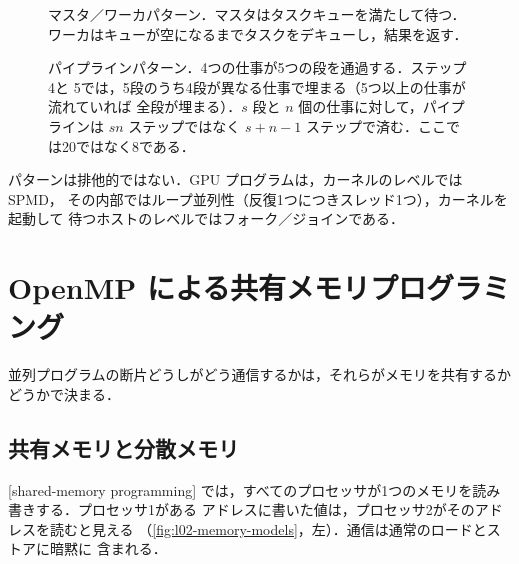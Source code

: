\documentclass[../main.tex]{subfiles}
\begin{document}
\begin{figure}[tb]
  \centering
  
  \caption{マスタ／ワーカパターン．マスタはタスクキューを満たして待つ．
    ワーカはキューが空になるまでタスクをデキューし，結果を返す．}
  \label{fig:l02-master-worker}
\end{figure}

\begin{marginfigure}
  \resizebox{\linewidth}{!}{}
  \caption{フォーク／ジョインパターン．1つの制御の流れが4つの並列タスクに
    フォークし，再びジョインする．}
  \label{fig:l02-fork-join}
\end{marginfigure}

\begin{figure}[tb]
  \centering
  
  \caption{パイプラインパターン．4つの仕事が5つの段を通過する．ステップ4と
    5では，5段のうち4段が異なる仕事で埋まる（5つ以上の仕事が流れていれば
    全段が埋まる）．$s$ 段と $n$ 個の仕事に対して，パイプラインは $sn$
    ステップではなく $s+n-1$ ステップで済む．ここでは20ではなく8である．}
  \label{fig:l02-pipeline}
\end{figure}

\begin{keypoint}
  パターンは排他的ではない．GPU プログラムは，カーネルのレベルでは SPMD，
  その内部ではループ並列性（反復1つにつきスレッド1つ），カーネルを起動して
  待つホストのレベルではフォーク／ジョインである．
\end{keypoint}

\section{OpenMP による共有メモリプログラミング}
\label{sec:l02-openmp}

並列プログラムの断片どうしがどう通信するかは，それらがメモリを共有するか
どうかで決まる．

\subsection{共有メモリと分散メモリ}

\begin{definition}[共有メモリプログラミング]
  [shared-memory programming]
  では，すべてのプロセッサが1つのメモリを読み書きする．プロセッサ1がある
  アドレスに書いた値は，プロセッサ2がそのアドレスを読むと見える
  （\cref{fig:l02-memory-models}，左）．通信は通常のロードとストアに暗黙に
  含まれる．
\end{definition}
\end{document}
